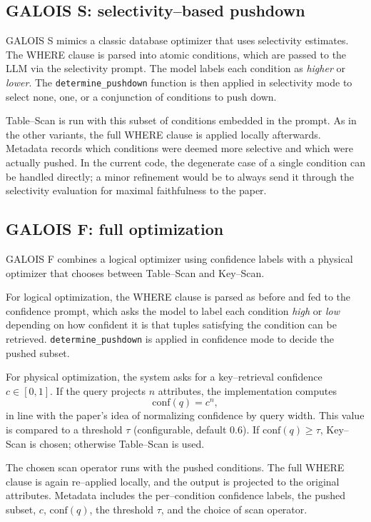 \documentclass[11pt]{article}
\begin{document}
\subsection{GALOIS S: selectivity–based pushdown}

GALOIS S mimics a classic database optimizer that uses selectivity estimates. The WHERE clause is parsed into atomic conditions, which are passed to the LLM via the selectivity prompt. The model labels each condition as \emph{higher} or \emph{lower}. The \texttt{determine\_pushdown} function is then applied in selectivity mode to select none, one, or a conjunction of conditions to push down.

Table–Scan is run with this subset of conditions embedded in the prompt. As in the other variants, the full WHERE clause is applied locally afterwards. Metadata records which conditions were deemed more selective and which were actually pushed. In the current code, the degenerate case of a single condition can be handled directly; a minor refinement would be to always send it through the selectivity evaluation for maximal faithfulness to the paper.

\subsection{GALOIS F: full optimization}

GALOIS F combines a logical optimizer using confidence labels with a physical optimizer that chooses between Table–Scan and Key–Scan.

For logical optimization, the WHERE clause is parsed as before and fed to the confidence prompt, which asks the model to label each condition \emph{high} or \emph{low} depending on how confident it is that tuples satisfying the condition can be retrieved. \texttt{determine\_pushdown} is applied in confidence mode to decide the pushed subset.

For physical optimization, the system asks for a key–retrieval confidence $c \in [0,1]$. If the query projects $n$ attributes, the implementation computes
\[
\mathrm{conf}(q) = c^{n},
\]
in line with the paper's idea of normalizing confidence by query width. This value is compared to a threshold $\tau$ (configurable, default $0.6$). If $\mathrm{conf}(q) \geq \tau$, Key–Scan is chosen; otherwise Table–Scan is used.

The chosen scan operator runs with the pushed conditions. The full WHERE clause is again re–applied locally, and the output is projected to the original attributes. Metadata includes the per–condition confidence labels, the pushed subset, $c$, $\mathrm{conf}(q)$, the threshold $\tau$, and the choice of scan operator.
\end{document}

